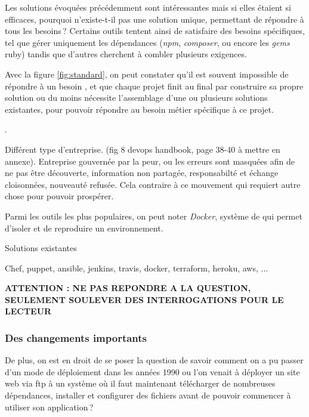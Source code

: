 Les solutions évoquées précédemment sont intéressantes mais si elles étaient si efficaces, pourquoi n'existe-t-il pas une solution unique, permettant de répondre à tous les besoins ? Certains outils tentent ainsi de satisfaire des besoins spécifiques, tel que gérer uniquement les dépendances (\emph{npm}, \emph{composer}, ou encore les \emph{gems} ruby) tandis que d'autres cherchent à combler plusieurs exigences.


Avec la figure \ref{fig:standard}, on peut constater qu'il est souvent impossible de répondre à un besoin , et que chaque projet finit au final par construire sa propre solution ou du moins nécessite l'assemblage d'une ou plusieurs solutions existantes, pour pouvoir répondre au besoin métier spécifique à ce projet.


.

Différent type d'entreprise. (fig 8 devops handbook, page 38-40 à mettre en annexe). Entreprise gouvernée par la peur, ou les erreurs sont masquées afin de ne pas être découverte, information non partagée, responsabilté et échange cloisonnées, nouveauté refusée. Cela contraire à ce mouvement qui requiert autre chose pour pouvoir prospérer.

Parmi les outils les plus populaires, on peut noter \emph{Docker}, système de  qui permet d'isoler et de reproduire un environnement.

Solutions existantes

Chef, puppet, ansible, jenkins, travis, docker, terraform, heroku, aws, ...

\textbf{ATTENTION : NE PAS REPONDRE A LA QUESTION, SEULEMENT SOULEVER DES INTERROGATIONS POUR LE LECTEUR}

\subsubsection{Des changements importants}

De plus, on est en droit de se poser la question de savoir comment on a pu passer d'un mode de déploiement dans les années 1990 ou l'on venait à déployer un site web via \gls{ftp} à un système où il faut maintenant télécharger de nombreuses dépendances, installer et configurer des fichiers avant de pouvoir commencer à utiliser son application ?

